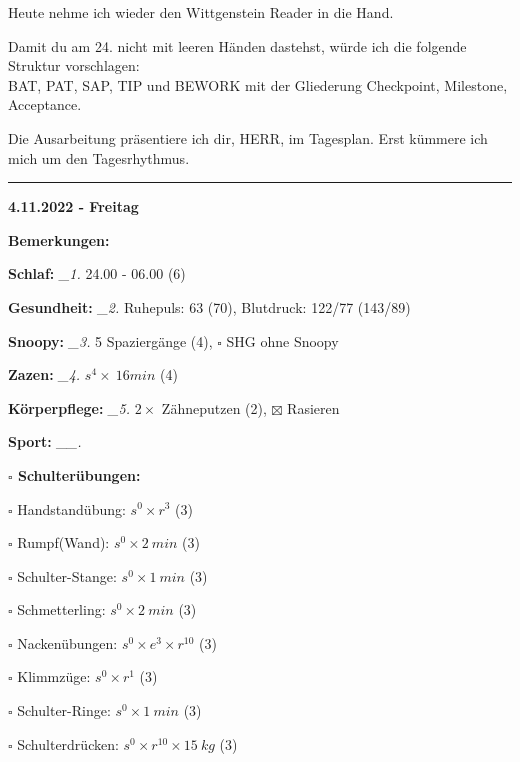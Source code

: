 \documentclass[10pt,a4paper]{article}
\newcommand\prop[1] {{\color {alizarin} {\bf #1}}}             %
\newcommand\rele[1] {{\color {english} \bf {#1}}}              %
\newcommand\mand[1] {{\color {burntorange} {\bf #1}}}          %
\newcommand\ddivide {\vskip -9pt \hrule \vskip 6pt}
\newcommand\topspace{\vskip -15pt \hskip 20pt}
\newcommand\n[1] { {\sl #1.} \hskip 5pt }
\begin{document}
\begin{mdframed}[style=daystyle]
  \vskip 2pt
  Heute nehme ich wieder den Wittgenstein Reader in die Hand.

  \vskip 2pt
  Damit du am 24. nicht mit leeren Händen dastehst, würde ich die folgende
  Struktur vorschlagen: \\
  BAT, PAT, SAP, TIP und BEWORK mit der Gliederung Checkpoint, Milestone,
  Acceptance.

  \vskip 2pt
  Die Ausarbeitung präsentiere ich dir, HERR, im Tagesplan. Erst kümmere ich
  mich um den Tagesrhythmus.

\end{mdframed}


\ddivide
{\rele {4.11.2022 - Freitag}}

\begin{mdframed}[style=daystyle]
  \begin{labeling}{{\mand {Bemerkungen:}}}
    \setlength\itemsep{-3pt}
  \item[{\mand {Schlaf:}}]        \n{\_1} 24.00 - 06.00 (6)
  \item[{\mand {Gesundheit:}}]    \n{\_2} Ruhepuls: 63 (70), Blutdruck: 122/77 (143/89)
  \item[{\mand {Snoopy:}}]        \n{\_3} 5 Spaziergänge (4), $\square$ SHG ohne Snoopy
  \item[{\mand {Zazen:}}]         \n{\_4} $s^4 \times\ 16 min$ (4)
  \item[{\mand {Körperpflege:}}]  \n{\_5} $2 \times$ Zähneputzen (2), $\boxtimes$ Rasieren
  \item[{\mand {Sport:}}]        \n{\_\_}
    \topspace
    \begin{minipage}{0.75\textwidth}  
      \begin{labeling}{\prop {$\square$ {Schulterübungen:}}} 
        \setlength\itemsep{-3pt}
      \item[$\square$ Handstandübung:]  $s^0 \times r^{3}$ (3)
      \item[$\square$ Rumpf(Wand):]     $s^0 \times 2\ min$ (3)
      \item[$\square$ Schulter-Stange:] $s^0 \times 1\ min$ (3)
      \item[$\square$ Schmetterling:]   $s^0 \times 2\ min$ (3)
      \item[$\square$ Nackenübungen:]   $s^0 \times e^3 \times r^{10}$ (3)
      \item[$\square$ Klimmzüge:]       $s^0 \times r^1$ (3)
      \item[$\square$ Schulter-Ringe:]  $s^0 \times 1\ min$ (3)
      \item[$\square$ Schulterdrücken:] $s^0 \times r^{10} \times 15\ kg$ (3)

\end{labeling}
\end{minipage}
\end{labeling}
\end{mdframed}
\end{document}
